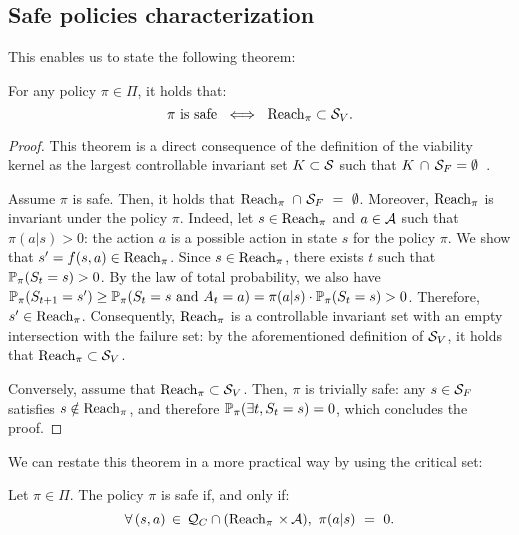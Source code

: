 \subsection{Safe policies characterization} \label{sec:safe policies characterization}
This enables us to state the following theorem:
\begin{theorem}
	For any policy $\pi\in\Pi$, it holds that:
	\begin{equation}
		\pi\text{ is safe}~\iff~\reach_\pi\subset\SV. \label{eq:safe policies stabilize sv}
	\end{equation}
	\label{thm:safe policies stabilize sv}
\end{theorem}
\begin{proof}
	This theorem is a direct consequence of the definition of the viability kernel as the largest controllable invariant set $K \subset\S$ such that $K \,\cap\,\SF=\emptyset$~\cite[Definition\,4.1.1]{aubin2011viability}.\par
	Assume $\pi$ is safe. Then, it holds that $\reach_\pi~\cap~\SF~=~\emptyset$. Moreover, $\reach_\pi$ is invariant under the policy $\pi$. Indeed, let $s\in\reach_\pi$ and $a\in\A$ such that $\pi(a|s) > 0$: the action $a$ is a possible action in state $s$ for the policy $\pi$. We show that $s' = f(s, a)\in\reach_\pi$. Since $s\in\reach_\pi$, there exists $t$ such that $\P_\pi(S_t = s) > 0$. By the law of total probability, we also have $\P_\pi(S_{t+1} = s') \geq \P_\pi(S_t = s~\text{and}~A_t = a) = \pi(a|s)\cdot\P_\pi(S_t = s) > 0$. Therefore, $s'\in\reach_\pi$. Consequently, $\reach_\pi$ is a controllable invariant set with an empty intersection with the failure set: by the aforementioned definition of $\SV$, it holds that $\reach_\pi\subset\SV$.\par
	Conversely, assume that $\reach_\pi\subset\SV$. Then, $\pi$ is trivially safe: any $s\in\SF$ satisfies $s\notin\reach_\pi$, and therefore $\P_\pi(\exists t, S_t = s) = 0$, which concludes the proof.
\end{proof}
We can restate this theorem in a more practical way by using the critical set:
\begin{corollary} \label{clry:safe policies on qc}
	Let $\pi\in\Pi$. The policy $\pi$ is safe if, and only if:
	\begin{equation}
		\forall\,(s, a)\,\in\, \QC \cap (\reach_\pi\,\times\,\A),~\pi(a|s)~=~0. \label{eq:safe policies on qc}
	\end{equation}
\end{corollary}
